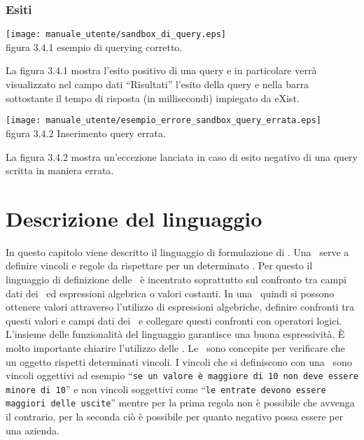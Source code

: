 \subsection{Esiti}
\begin{center}
\texttt{[image: manuale\_utente/sandbox\_di\_query.eps]}\\
 figura 3.4.1 esempio di querying corretto.
\end{center}
La figura 3.4.1 mostra l'esito positivo di una query e in particolare verr\`a visualizzato nel campo dati ``Risultati'' l'esito della query e nella barra sottostante il tempo di risposta (in millisecondi) impiegato da eXist.

\begin{center}
\texttt{[image: manuale\_utente/esempio\_errore\_sandbox\_query\_errata.eps]}\\
figura 3.4.2 Inserimento query errata.
\end{center}
La figura 3.4.2 mostra un'eccezione lanciata in caso di esito negativo di una query scritta in maniera errata.


\chapter{Descrizione del linguaggio}
In questo capitolo viene descritto il linguaggio di formulazione di \br. Una \br\ serve a definire vincoli e regole da rispettare per un determinato \bo. Per questo il linguaggio di definizione delle \br\ \`e incentrato soprattutto sul confronto tra campi dati dei \bo\ ed espressioni algebrica o valori costanti. In una \br\ quindi si possono ottenere valori attraverso l'utilizzo di espressioni algebriche, definire confronti tra questi valori e campi dati dei \bo\ e collegare questi confronti con operatori logici. L'insieme delle funzionalit\`a del linguaggio garantisce una buona espressivit\`a.
\`E molto importante chiarire l'utilizzo delle \br. Le \br\ sono concepite per verificare che un oggetto rispetti determinati vincoli. I vincoli che si definiscono con una \br\ sono vincoli oggettivi ad esempio ``\texttt{se un valore è maggiore di 10 non deve essere minore di 10}'' e non vincoli soggettivi come ``\texttt{le entrate devono essere maggiori delle uscite}'' mentre per la prima regola non \`e possibile che avvenga il contrario, per la seconda ci\`o \`e possibile per quanto negativo possa essere per una azienda.

